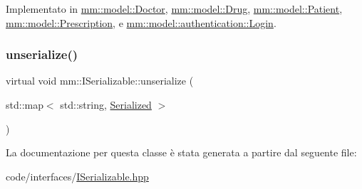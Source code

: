 Implementato in \hyperlink{classmm_1_1model_1_1_doctor_a2171a9cb9c8a24ad0c0331edae957910}{mm\+::model\+::\+Doctor}, \hyperlink{classmm_1_1model_1_1_drug_a5d4fa5bf5e4700f833547c5114764c7b}{mm\+::model\+::\+Drug}, \hyperlink{classmm_1_1model_1_1_patient_ae3ac219cd109e8c53daaf9b2758c3a0e}{mm\+::model\+::\+Patient}, \hyperlink{classmm_1_1model_1_1_prescription_a592ff88dfa9625a383a7b073a64863b1}{mm\+::model\+::\+Prescription}, e \hyperlink{structmm_1_1model_1_1authentication_1_1_login_a69ec1a769ef1659b8ed39d5e23c24333}{mm\+::model\+::authentication\+::\+Login}.

\mbox{\label{classmm_1_1_i_serializable_a8e5329b3b23cd0dff0ea8f5f63bab996}} 
\subsubsection{\texorpdfstring{unserialize()}{unserialize()}}
{\footnotesize\ttfamily virtual void mm\+::\+I\+Serializable\+::unserialize (\begin{DoxyParamCaption}\item[{std\+::map$<$ std\+::string, \hyperlink{structmm_1_1_serialized}{Serialized} $>$}]{ }\end{DoxyParamCaption})\hspace{0.3cm}{\ttfamily [pure virtual]}}



La documentazione per questa classe è stata generata a partire dal seguente file\+:\begin{DoxyCompactItemize}
\item 
code/interfaces/\hyperlink{_i_serializable_8hpp}{I\+Serializable.\+hpp}\end{DoxyCompactItemize}
